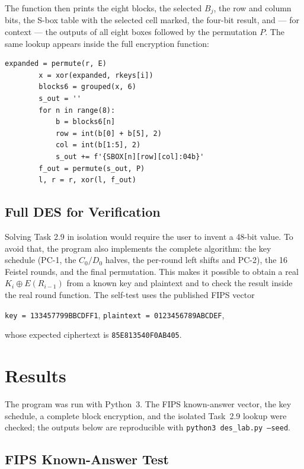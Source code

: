 \documentclass[12pt,a4paper]{article}
\begin{document}
The function then prints the eight blocks, the selected $B_j$, the row and column bits, the S-box table with the selected cell marked, the four-bit result, and --- for context --- the outputs of all eight boxes followed by the permutation $P$. The same lookup appears inside the full encryption function:

\begin{lstlisting}[style=python,caption={Use of the eight S-boxes inside the DES round function}]
        expanded = permute(r, E)
        x = xor(expanded, rkeys[i])
        blocks6 = grouped(x, 6)
        s_out = ''
        for n in range(8):
            b = blocks6[n]
            row = int(b[0] + b[5], 2)
            col = int(b[1:5], 2)
            s_out += f'{SBOX[n][row][col]:04b}'
        f_out = permute(s_out, P)
        l, r = r, xor(l, f_out)
\end{lstlisting}

\subsection{Full DES for Verification}

Solving Task 2.9 in isolation would require the user to invent a 48-bit value. To avoid that, the program also implements the complete algorithm: the key schedule (PC-1, the $C_0/D_0$ halves, the per-round left shifts and PC-2), the 16 Feistel rounds, and the final permutation. This makes it possible to obtain a real $K_i\oplus E(R_{i-1})$ from a known key and plaintext and to check the result inside the real round function. The self-test uses the published FIPS vector

\begin{center}
  \texttt{key = 133457799BBCDFF1}, \quad
  \texttt{plaintext = 0123456789ABCDEF},
\end{center}

whose expected ciphertext is \texttt{85E813540F0AB405}.

\section{Results}

The program was run with Python~3. The FIPS known-answer vector, the key schedule, a complete block encryption, and the isolated Task~2.9 lookup were checked; the outputs below are reproducible with \texttt{python3 des\_lab.py --seed}.

\subsection{FIPS Known-Answer Test}
\end{document}
